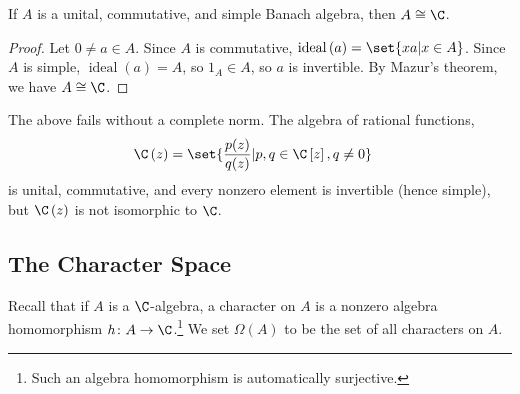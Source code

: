 \documentclass[10pt]{mypackage}
\begin{document}
\begin{corollary}
  If $A$ is a unital, commutative, and simple Banach algebra, then $A\cong \C$.
\end{corollary}
\begin{proof}
  Let $0\neq a\in A$. Since $A$ is commutative, $\operatorname{ideal}\left(a\right) = \set{xa | x\in A}$. Since $A$ is simple, $\operatorname{ideal}\left(a\right) = A$, so $1_A \in A$, so $a$ is invertible. By Mazur's theorem, we have $A\cong \C$.
\end{proof}
\begin{remark}
  The above fails without a complete norm. The algebra of rational functions,
  \begin{align*}
    \C\left(z\right) &= \set{\frac{p(z)}{q(z)} | p,q\in \C\left[z\right],q\neq 0}
  \end{align*}
  is unital, commutative, and every nonzero element is invertible (hence simple), but $\C\left(z\right)$ is not isomorphic to $\C$.
\end{remark}
\subsection{The Character Space}%
Recall that if $A$ is a $\C$-algebra, a character on $A$ is a nonzero algebra homomorphism $h\colon A\rightarrow \C$.\footnote{Such an algebra homomorphism is automatically surjective.} We set $\Omega\left(A\right)$ to be the set of all characters on $A$.\newline
\end{document}
